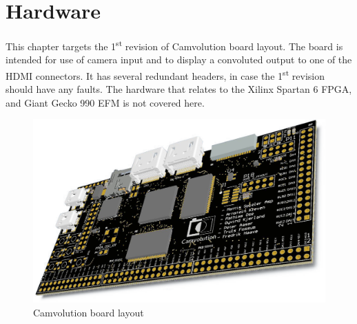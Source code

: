 \section{Hardware}
This chapter targets the 1\textsuperscript{st} revision of Camvolution board layout. The board is intended for use of camera input and to display a convoluted output to one of the HDMI connectors. It has several redundant headers, in case the 1\textsuperscript{st} revision should have any faults. The hardware that relates to the Xilinx Spartan 6 FPGA, and Giant Gecko 990 EFM is not covered here.

\begin{figure}
    \includegraphics[width=\linewidth]{img/OverviewCamvolutionKit}
    \caption{Camvolution board layout}
\end{figure}

